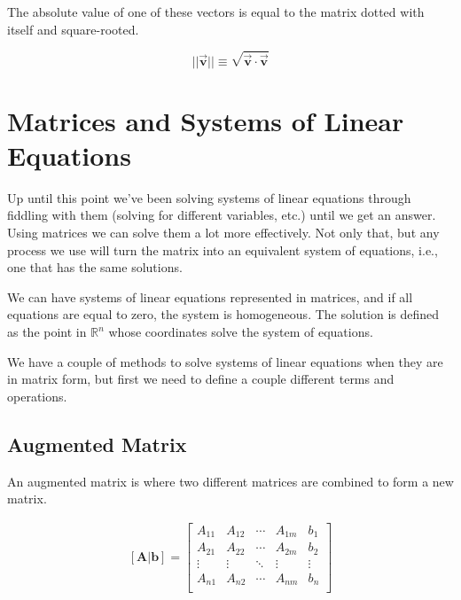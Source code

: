 \documentclass[12pt, landscape, twocolumn]{article}
\let\oldvec\vec
\renewcommand{\vec}[1]{\oldvec{\mathbf{ #1 } } }                    %
\begin{document}
    The absolute value of one of these vectors is equal to the matrix dotted with itself and square-rooted.

    \begin{equation}\label{eq:matrix_abs_val}
        ||\vec{v}|| \equiv \sqrt{\vec{v} \cdot \vec{v} }
    \end{equation}

\section{Matrices and Systems of Linear Equations}
Up until this point we've been solving systems of linear equations through fiddling with them (solving for different variables, etc.) until we get an answer. Using matrices we can solve them a lot more effectively. Not only that, but any process we use will turn the matrix into an equivalent system of equations, i.e., one that has the same solutions.

We can have systems of linear equations represented in matrices, and if all equations are equal to zero, the system is homogeneous. The solution is defined as the point in $\mathbb{R}^n$ whose coordinates solve the system of equations.

We have a couple of methods to solve systems of linear equations when they are in matrix form, but first we need to define a couple different terms and operations.

    \subsection{Augmented Matrix}
    An augmented matrix is where two different matrices are combined to form a new matrix.

    \begin{equation}\label{eq:augmented_matrix}
    \begin{aligned}
        \mathbf{[A|b]}=
        \left[\begin{array}{cccc|c}
        A_{11} & A_{12} & \cdots & A_{1m} & b_1\\
        A_{21} & A_{22} & \cdots & A_{2m} & b_2\\
        \vdots & \vdots & \ddots & \vdots & \vdots\\
        A_{n1} & A_{n2} & \cdots & A_{nm} & b_n\\
        \end{array}\right]\\
    \end{aligned}
    \end{equation}
\end{document}
